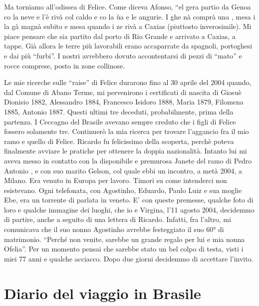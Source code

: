 \documentclass[a4paper,10pt]{book}
\begin{document}
Ma torniamo all’odissea di Felice. Come diceva Afonso, “el gera partio da Genoa co la neve e l’è rivà col caldo e co la ùa e le angurie. I ghe nà  comprà una , mesa i la gà magnà subito e mesa quando i ze rivà a Caxias (piuttosto inverosimile).\newline
Mi piace pensare che sia partito dal porto di Rio Grande e arrivato a Caxias, a tappe.\newline
Già allora le terre più lavorabili erano accaparrate da spagnoli, portoghesi e dai più “furbi”. I nostri avrebbero dovuto accontentarsi di pezzi di “mato” e rocce comprese, posto in zone collinose.

Le mie ricerche sulle “raise” di Felice durarono fino al 30 aprile del 2004 quando, dal Comune di Abano Terme, mi pervenirono i certificati di nascita di Giosuè Dionisio 1882, Alessandro 1884, Francesco Isidoro 1888, Maria 1879, Filomena 1885, Antonio 1887. Questi ultimi tre deceduti, probabilmente, prima della partenza. I Ceccagno del Brasile avevano sempre creduto che i figli di Felice fossero solamente tre.\newline
Continuerò la mia ricerca per trovare l’aggancio fra il mio ramo e quello di Felice.\newline
Ricardo fu felicissimo della scoperta, perchè poteva finalmente avviare le pratiche per ottenere la doppia nazionalità.\newline
Intanto lui mi aveva messo in contatto con la disponibile e premurosa Janete del ramo di Pedro Antonio , e con suo marito Gelson, col quale ebbi un  incontro, a metà 2004, a Milano. Era venuto in Europa per lavoro.\newline
Timori su come intenderci non esistevano. Ogni telefonata, con Agostinho, Eduardo, Paulo Luiz e sua moglie Ebe, era un torrente di parlata in veneto.\newline
E’ con queste premesse, qualche foto di loro e qualche immagine dei luoghi, che io e Virgina, l’11 agosto 2004, decidemmo di  partire, anche a seguito di una lettera di Ricardo. Infatti, fra l’altro, mi comunicava che il suo nonno Agostinho avrebbe festeggiato il suo 60° di matrimonio. “Perché non venite, sarebbe un grande regalo per lui e mia nonna Ofelia”.\newline
Per un momento pensai che sarebbe stato un bel colpo di testa, visti i miei 77 anni e qualche acciacco. Dopo due giorni decidemmo di accettare l’invito.

\chapter{Diario del viaggio in Brasile}
\end{document}
